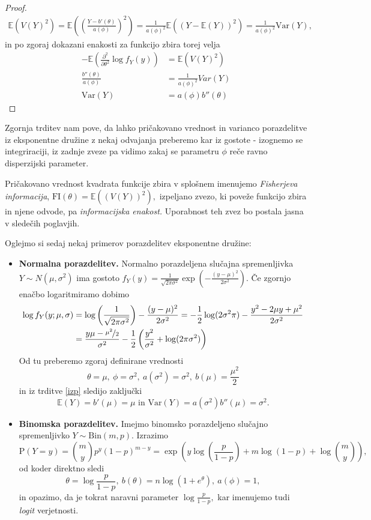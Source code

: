 \documentclass[12pt,a4paper]{amsart}
\theoremstyle{definition} %
\theoremstyle{plain} %
\begin{document}
\begin{proof}
\begin{gather*}
    \mathbb{E}\left(V(Y)^2\right) = \mathbb{E}\left(\left(\frac{Y-b'(\theta)}{a(\phi) }\right)^2\right) = \frac{1}{a(\phi)^2}\mathbb{E}((Y - \mathbb{E}(Y))^2) = \frac{1}{a(\phi)^2}\mathrm{Var}(Y),
\end{gather*}
in po zgoraj dokazani enakosti za funkcijo zbira torej velja
\begin{align*}
    -\mathbb{E}\left(\frac{\partial^2}{\partial\theta^2}\log f_{Y}(y)\right) &= \mathbb{E}\left(V(Y)^2\right) \\
    \frac{b''(\theta)}{a(\phi)} &= \frac{1}{a(\phi)^2}Var(Y) \\
    \mathrm{Var}(Y) &= a(\phi)b''(\theta)
\end{align*}
\end{proof}
Zgornja trditev nam pove, da lahko pričakovano vrednost in varianco porazdelitve iz eksponentne družine z nekaj odvajanja preberemo kar iz gostote - izognemo se integriraciji, iz zadnje
zveze pa vidimo zakaj se parametru $\phi$ reče ravno disperzijski parameter.

Pričakovano vrednost kvadrata funkcije zbira v splošnem imenujemo \textit{Fisherjeva informacija}, $\mathrm{FI}(\theta) = \mathbb{E}((V(Y))^2),$ izpeljano zvezo, ki poveže funkcijo zbira in njene odvode, pa \textit{informacijska enakost.}
Uporabnost teh zvez bo postala jasna v sledečih poglavjih.

Oglejmo si sedaj nekaj primerov porazdelitev eksponentne družine:
\begin{itemize}
    \item \textbf{Normalna porazdelitev.} Normalno porazdeljena slučajna spremenljivka $Y \sim N(\mu, \sigma^2)$
    ima gostoto $f_{Y}(y) = \frac{1}{\sqrt{2\pi\sigma^2}}\exp{\left(-\frac{(y-\mu)^2}{2\sigma^2}\right)}.$
    Če zgornjo enačbo logaritmiramo dobimo
    \begin{align*}
        \log f_{Y}(y;\mu, \sigma) &= \log\left(\frac{1}{\sqrt{2\pi\sigma^2}}\right) -\frac{(y-\mu)^2}{2\sigma^2} = -\frac{1}{2}\log(2\sigma^2\pi) - \frac{y^2 - 2\mu y + \mu^2}{2 \sigma^2}    \\ \nonumber
                            &= \frac{y\mu-\nicefrac{\mu^2}{2}}{\sigma^2} - \frac{1}{2}\left(\frac{y^2}{\sigma^2} + \log(2\pi\sigma^2)\right) 
    \end{align*}
    Od tu preberemo zgoraj definirane vrednosti
    \[
        \theta = \mu,~\phi = \sigma^2,~a(\sigma^2)=\sigma^2,~b(\mu) = \frac{\mu^2}{2}
    \]
    in iz trditve \ref{izp} sledijo zaključki
    \[
        \mathbb{E}(Y) = b'(\mu) = \mu \text{ in } \mathrm{Var}(Y) = a(\sigma^2)b''(\mu) = \sigma^2.
    \]

    \item \textbf{Binomska porazdelitev.} Imejmo binomsko porazdeljeno slučajno spremenljivko $Y \sim \mathrm{Bin}(m,p).$ Izrazimo 
    \[
        \mathrm{P}(Y = y) = \binom{m}{y}p^y(1-p)^{m-y} = \exp\left(y\log\left(\frac{p}{1-p}\right) + m\log(1-p) + \log{\binom{m}{y}}\right),
    \]
    od koder direktno sledi
    \[
        \theta = \log\frac{p}{1-p},~b(\theta) = n\log(1 + e^{\theta}),~a(\phi) = 1,
    \]
    in opazimo, da je tokrat naravni parameter $\log\frac{p}{1-p},$ kar imenujemo tudi \textit{logit} verjetnosti.
\end{itemize}
\end{document}
